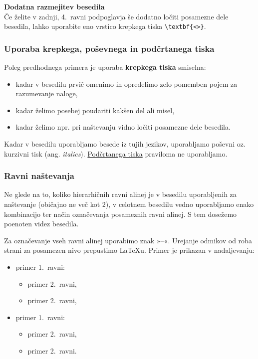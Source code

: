 \textbf{Dodatna razmejitev besedila}\\[\baselineskip]
Če želite v zadnji, 4.\ ravni podpoglavja še dodatno ločiti posamezne dele besedila, lahko uporabite eno vrstico krepkega tiska \verb|\textbf{<>}|.

\subsubsection{Uporaba krepkega, poševnega in podčrtanega tiska}\label{sec:emphasis_types}

Poleg predhodnega primera je uporaba \textbf{krepkega tiska} smiselna:
\begin{itemize}
	\item kadar v besedilu prvič omenimo in opredelimo zelo pomemben pojem za razumevanje naloge,
	\item kadar želimo posebej poudariti kakšen del ali misel,
	\item kadar želimo npr. pri naštevanju vidno ločiti posamezne dele besedila.
\end{itemize}

Kadar v besedilu uporabljamo besede iz tujih jezikov, uporabljamo poševni oz. kurzivni tisk (ang. \emph{italics}). \underline{Podčrtanega tiska} praviloma ne uporabljamo.


\subsubsection{Ravni naštevanja}\label{sec:itemizing}

Ne glede na to, koliko hierarhičnih ravni alinej je v besedilu uporabljenih za naštevanje (običajno ne več kot 2), v celotnem besedilu vedno uporabljamo enako kombinacijo ter način označevanja posameznih ravni alinej. S tem dosežemo poenoten videz besedila.

Za označevanje vseh ravni alinej uporabimo znak »--«. Urejanje odmikov od roba strani za posamezen nivo prepustimo \LaTeX u. Primer je prikazan v nadaljevanju:
\begin{itemize}
	\item primer 1.\ ravni:
	\begin{itemize}
		\item primer 2.\ ravni,
		\item primer 2.\ ravni,
	\end{itemize}
	\item primer 1.\ ravni:
	\begin{itemize}
		\item primer 2.\ ravni,
		\item primer 2.\ ravni.
	\end{itemize}
\end{itemize}

